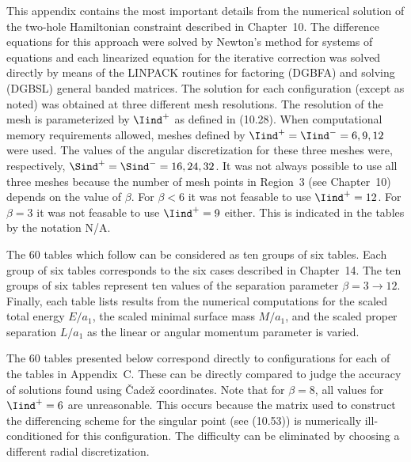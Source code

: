 This appendix contains the most important details from the numerical solution
of the two-hole Hamiltonian constraint described in Chapter~10.  The difference
equations for this approach were solved by Newton's method for systems of
equations and each linearized equation for the iterative correction was solved
directly by means of the LINPACK routines for factoring (DGBFA) and solving
(DGBSL) general banded matrices.  The solution for each configuration (except as
noted) was obtained at three different mesh resolutions.  The resolution of the
mesh is parameterized by $\Iind^+$ as defined in (10.28).  When computational
memory requirements allowed, meshes defined by $\Iind^+ = \Iind^- = 6,9,12$ were
used.  The values of the angular discretization for these three meshes were,
respectively, $\Sind^+ = \Sind^- = 16, 24, 32$. It was not always possible to use
all three meshes because the number of mesh points in Region~3 (see Chapter~10)
depends on the value of $\beta$.  For $\beta < 6$ it was not feasable to use
$\Iind^+=12$.  For $\beta=3$ it was not feasable to use $ \Iind^+=9$ either. 
This is indicated in the tables by the notation N/A.

The 60 tables which follow can be considered as ten groups of six tables.  Each
group of six tables corresponds to the six cases described in Chapter~14.  The
ten groups of six tables represent ten values of the separation parameter
$\beta=3\to12$.  Finally, each table lists results from the numerical
computations for the scaled total energy $E/a_1$, the scaled minimal surface
mass $M/a_1$, and the scaled proper separation $L/a_1$ as the linear or angular
momentum parameter is varied.

The 60 tables presented below correspond directly to configurations for each of
the tables in Appendix~C.  These can be directly compared to judge the accuracy
of solutions found using \v{C}ade\v{z} coordinates.  Note that for $\beta=8$,
all values for $\Iind^+=6$ are unreasonable.  This occurs because the  matrix
used to construct the differencing scheme for the singular point (see (10.53))
is numerically ill-conditioned for this configuration.  The difficulty can be
eliminated by choosing a different radial discretization.

\vfill
\eject











